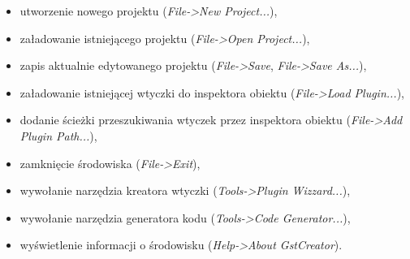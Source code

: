 \documentclass[12pt]{article}
\begin{document}
\begin{itemize}
  \setlength{\itemsep}{0em}
\item utworzenie nowego projektu (\textit{File->New Project...}),
\item załadowanie istniejącego projektu (\textit{File->Open Project...}),
\item zapis aktualnie edytowanego projektu (\textit{File->Save}, \textit{File->Save As...}),
\item załadowanie istniejącej wtyczki do inspektora obiektu (\textit{File->Load Plugin...}),
\item dodanie ścieżki przeszukiwania wtyczek przez inspektora obiektu (\textit{File->Add Plugin Path...}),
\item zamknięcie środowiska (\textit{File->Exit}),
\item wywołanie narzędzia kreatora wtyczki (\textit{Tools->Plugin Wizzard...}),
\item wywołanie narzędzia generatora kodu (\textit{Tools->Code Generator...}),
\item wyświetlenie informacji o środowisku (\textit{Help->About GstCreator}).
\end{itemize}
\end{document}
